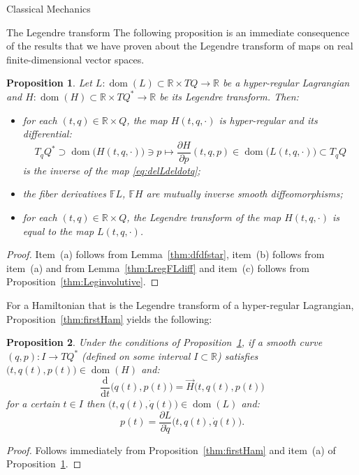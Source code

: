 \documentclass[oneside,a4paper,11pt]{amsbook}
\newcommand{\R}{\mathds R}
\newcommand{\dd}{\mathrm d}
\DeclareMathOperator{\Dom}{dom}
\theoremstyle{remark}\newtheorem{exercise}{Exercise}[chapter]
\theoremstyle{plain}\newtheorem{teo}{Theorem}[section]
\theoremstyle{plain}\newtheorem{lem}[teo]{Lemma}
\theoremstyle{plain}\newtheorem{prop}[teo]{Proposition}
\theoremstyle{plain}\newtheorem{cor}[teo]{Corollary}
\theoremstyle{definition}\newtheorem{defin}[teo]{Definition}
\theoremstyle{remark}\newtheorem{rem}[teo]{Remark}
\theoremstyle{definition}\newtheorem{notation}[teo]{Notation}
\theoremstyle{definition}\newtheorem{convention}[teo]{Convention}
\theoremstyle{definition}\newtheorem{example}[teo]{Example}
\numberwithin{section}{chapter}
\numberwithin{equation}{section}
\begin{document}
\begin{chapter}{Classical Mechanics}
\begin{section}{The Legendre transform}
The following proposition is an immediate consequence of the results that we have proven about the Legendre transform of maps on real finite-dimensional
vector spaces.
\begin{prop}\label{thm:LHproperties}
Let $L:\Dom(L)\subset\R\times TQ\to\R$ be a hyper-regular Lagrangian and $H:\Dom(H)\subset\R\times TQ^*\to\R$ be its Legendre transform. Then:
\begin{itemize}
\item[(a)] for each $(t,q)\in\R\times Q$, the map $H(t,q,\cdot)$ is hyper-regular and its differential:
\[T_qQ^*\supset\Dom\!\big(H(t,q,\cdot)\big)\ni p\longmapsto\frac{\partial H}{\partial p}(t,q,p)\in\Dom\!\big(L(t,q,\cdot)\big)\subset T_qQ\]
is the inverse of the map \eqref{eq:delLdeldotq};
\item[(b)] the fiber derivatives $\mathbb FL$, $\mathbb FH$ are mutually inverse smooth diffeomorphisms;
\item[(c)] for each $(t,q)\in\R\times Q$, the Legendre transform of the map $H(t,q,\cdot)$ is equal to the map $L(t,q,\cdot)$.
\end{itemize}
\end{prop}
\begin{proof}
Item~(a) follows from Lemma~\ref{thm:dfdfstar}, item~(b) follows from item~(a) and from Lemma~\ref{thm:LregFLdiff} and item~(c) follows from
Proposition~\ref{thm:Leginvolutive}.
\end{proof}

For a Hamiltonian that is the Legendre transform of a hyper-regular Lagrangian, Proposition~\ref{thm:firstHam} yields the following:
\begin{prop}\label{thm:pparLpardotq}
Under the conditions of Proposition~\ref{thm:LHproperties}, if a smooth curve $(q,p):I\to TQ^*$ (defined on some interval $I\subset\R$)
satisfies $\big(t,q(t),p(t)\big)\in\Dom(H)$ and:
\begin{equation}\label{eq:Hameqintr}
\frac{\dd}{\dd t}\big(q(t),p(t)\big)=\vec H\big(t,q(t),p(t)\big)
\end{equation}
for a certain $t\in I$ then $\big(t,q(t),\dot q(t)\big)\in\Dom(L)$ and:
\begin{equation}\label{eq:pparLpardotq}
p(t)=\frac{\partial L}{\partial\dot q}\big(t,q(t),\dot q(t)\big).
\end{equation}
\end{prop}
\begin{proof}
Follows immediately from Proposition~\ref{thm:firstHam} and item~(a) of Proposition~\ref{thm:LHproperties}.
\end{proof}


\end{section}
\end{chapter}
\end{document}
